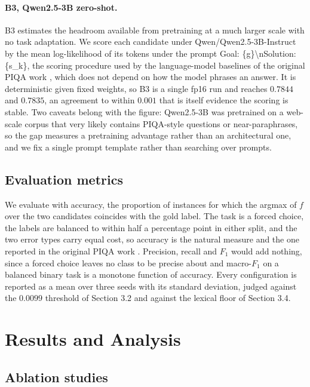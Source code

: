 \documentclass[11pt]{article}
\begin{document}
\paragraph{B3, Qwen2.5-3B zero-shot.}

B3 estimates the headroom available from pretraining at a much larger scale with no task adaptation. We score each candidate under Qwen/Qwen2.5-3B-Instruct \citep{qwen2024} by the mean log-likelihood of its tokens under the prompt Goal: \{g\}\textbackslash{}nSolution: \{s\_k\}, the scoring procedure used by the language-model baselines of the original PIQA work \citep{bisk2020piqa}, which does not depend on how the model phrases an answer. It is deterministic given fixed weights, so B3 is a single fp16 run and reaches $0.7844$ and $0.7835$, an agreement to within $0.001$ that is itself evidence the scoring is stable. Two caveats belong with the figure: Qwen2.5-3B was pretrained on a web-scale corpus that very likely contains PIQA-style questions or near-paraphrases, so the gap measures a pretraining advantage rather than an architectural one, and we fix a single prompt template rather than searching over prompts.

\subsection{Evaluation metrics}

We evaluate with accuracy, the proportion of instances for which the argmax of $f$ over the two candidates coincides with the gold label. The task is a forced choice, the labels are balanced to within half a percentage point in either split, and the two error types carry equal cost, so accuracy is the natural measure and the one reported in the original PIQA work \citep{bisk2020piqa}. Precision, recall and ${F}_{1}$ would add nothing, since a forced choice leaves no class to be precise about and macro-${F}_{1}$ on a balanced binary task is a monotone function of accuracy. Every configuration is reported as a mean over three seeds with its standard deviation, judged against the $0.0099$ threshold of Section 3.2 and against the lexical floor of Section 3.4.

\section{Results and Analysis}

\subsection{Ablation studies}
\end{document}
